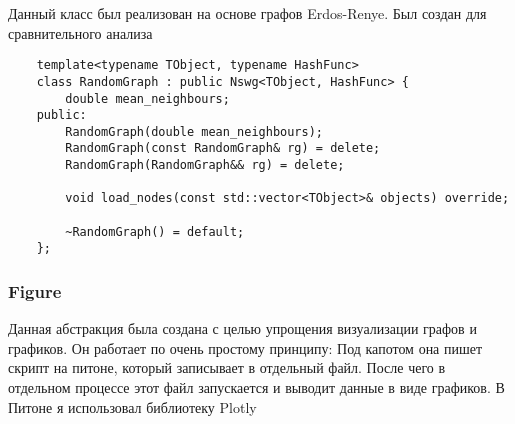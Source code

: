 Данный класс был реализован на основе графов Erdos-Renye. Был создан для сравнительного анализа

\begin{verbatim}
    template<typename TObject, typename HashFunc>
    class RandomGraph : public Nswg<TObject, HashFunc> {
        double mean_neighbours;
    public:
        RandomGraph(double mean_neighbours);
        RandomGraph(const RandomGraph& rg) = delete;
        RandomGraph(RandomGraph&& rg) = delete;

        void load_nodes(const std::vector<TObject>& objects) override;

        ~RandomGraph() = default;
    };
\end{verbatim}

\subsubsection{Figure}

Данная абстракция была создана с целью упрощения визуализации графов и графиков.
Он работает по очень простому принципу: Под капотом она пишет скрипт на питоне, который
записывает в отдельный файл. После чего в отдельном процессе этот файл запускается и 
выводит данные в виде графиков. В Питоне я использовал библиотеку Plotly


